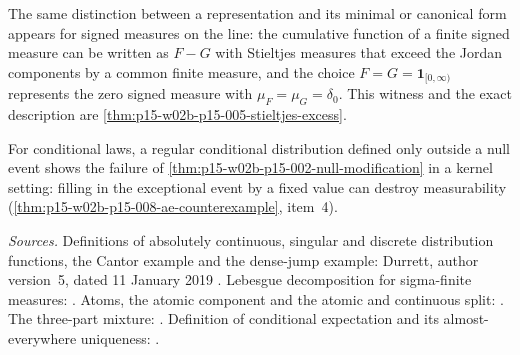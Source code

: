 The same distinction between a representation and its minimal or
canonical form appears for signed measures on the line: the cumulative
function of a finite signed measure can be written as \(F-G\) with
Stieltjes measures that exceed the Jordan components by a common finite
measure, and the choice \(F=G=\mathbf1_{[0,\infty)}\) represents the
zero signed measure with \(\mu_F=\mu_G=\delta_0\). This witness and the
exact description are \cref{thm:p15-w02b-p15-005-stieltjes-excess}.

For conditional laws, a regular conditional distribution defined only
outside a null event shows the failure of
\cref{thm:p15-w02b-p15-002-null-modification} in a kernel setting: filling
in the exceptional event by a fixed value can destroy measurability
(\cref{thm:p15-w02b-p15-008-ae-counterexample}, item~4).

\emph{Sources.} Definitions of absolutely continuous, singular and
discrete distribution functions, the Cantor example and the dense-jump
example: Durrett, author version~5, dated 11 January 2019
\cite[pp.~13--14]{DurrettPTEAuthor2019}. Lebesgue decomposition for
sigma-finite measures: \cite[thm.~A.4.7, p.~469]{DurrettPTEAuthor2019}.
Atoms, the atomic component and the atomic and continuous split:
\cite[sec.~V.2, pp.~137--138]{Feller1971ProbabilityII}. The three-part
mixture: \cite[sec.~V.3, p.~142]{Feller1971ProbabilityII}. Definition of
conditional expectation and its almost-everywhere uniqueness:
\cite[pp.~205--206]{DurrettPTEAuthor2019}.
